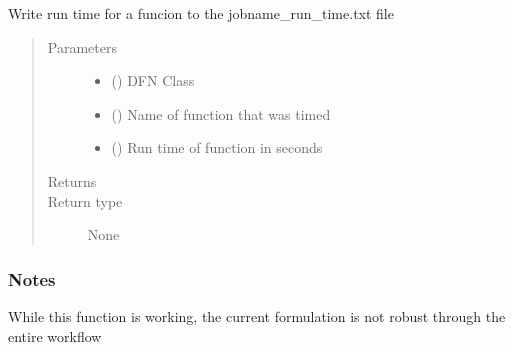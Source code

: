 \documentclass[letterpaper,10pt,english]{sphinxmanual}
\begin{document}
\begin{fulllineitems}
\label{\detokenize{pydfnworks:pydfnworks.general.general_functions.dump_time}}
Write run time for a funcion to the jobname\_run\_time.txt file
\begin{quote}\begin{description}
\item[{Parameters}] \leavevmode\begin{itemize}
\item {} 
 () \textendash{} DFN Class

\item {} 
 () \textendash{} Name of function that was timed

\item {} 
 () \textendash{} Run time of function in seconds

\end{itemize}

\item[{Returns}] \leavevmode


\item[{Return type}] \leavevmode
None

\end{description}\end{quote}
\subsubsection*{Notes}

While this function is working, the current formulation is not robust through the entire workflow

\end{fulllineitems}

\end{document}
